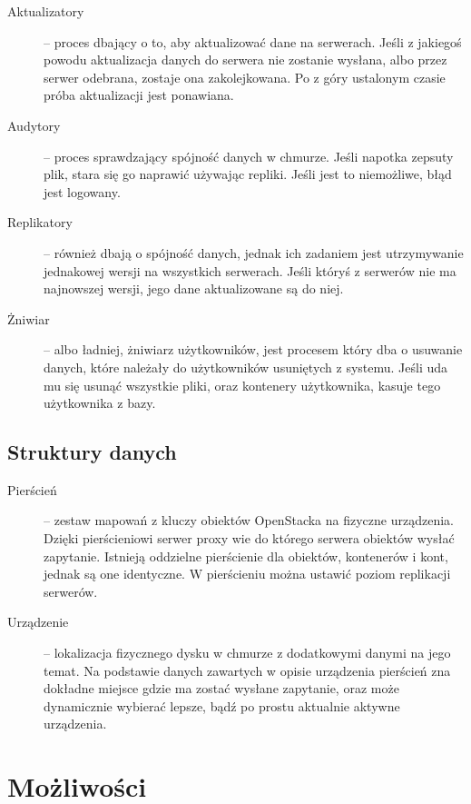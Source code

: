 \begin{description}
\item[Aktualizatory] -- proces dbający o to, aby aktualizować dane na serwerach. Jeśli z jakiegoś powodu aktualizacja danych do serwera nie zostanie wysłana, albo przez serwer odebrana, zostaje ona zakolejkowana. Po z góry ustalonym czasie próba aktualizacji jest ponawiana.
\item[Audytory] -- proces sprawdzający spójność danych w chmurze. Jeśli napotka zepsuty plik, stara się go naprawić używając repliki. Jeśli jest to niemożliwe, błąd jest logowany. 
\item[Replikatory] -- również dbają o spójność danych, jednak ich zadaniem jest utrzymywanie jednakowej wersji na wszystkich serwerach. Jeśli któryś z serwerów nie ma najnowszej wersji, jego dane aktualizowane są do niej.
\item[Żniwiar] -- albo ładniej, żniwiarz użytkowników, jest procesem który dba o usuwanie danych, które należały do użytkowników usuniętych z systemu. Jeśli uda mu się usunąć wszystkie pliki, oraz kontenery użytkownika, kasuje tego użytkownika z bazy.
\end{description}

\subsection{Struktury danych}\label{sub:struktury danych}

\begin{description}
\item[Pierścień] -- zestaw mapowań z kluczy obiektów OpenStacka na fizyczne urządzenia. Dzięki pierścieniowi serwer proxy wie do którego serwera obiektów wysłać zapytanie. Istnieją oddzielne pierścienie dla obiektów, kontenerów i kont, jednak są one identyczne. W pierścieniu można ustawić poziom replikacji serwerów.
\item[Urządzenie] -- lokalizacja fizycznego dysku w chmurze z dodatkowymi danymi na jego temat. Na podstawie danych zawartych w opisie urządzenia pierścień zna dokładne miejsce gdzie ma zostać wysłane zapytanie, oraz może dynamicznie wybierać lepsze, bądź po prostu aktualnie aktywne urządzenia.
\end{description}

\section{Możliwości}\label{sec:możliwości}


